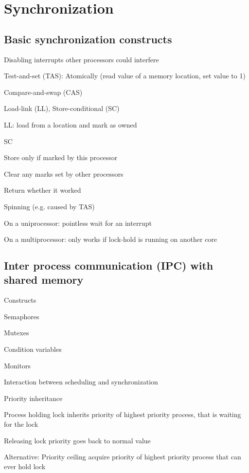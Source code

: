 \section{Synchronization}

\subsection{Basic synchronization constructs}
\enumstart
	\item Disabling interrupts \arrow other processors could interfere
	\item Test-and-set (TAS): Atomically (read value of a memory location, set value to 1)
	\item Compare-and-swap (CAS)
	\item Load-link (LL), Store-conditional (SC)
	\enumstart
		\item LL: load from a location and mark as owned
		\item SC
		\enumstart
			\item Store only if marked by this processor
			\item Clear any marks set by other processors
			\item Return whether it worked
		\enumend
	\enumend
	\item Spinning (e.g. caused by TAS)
	\enumstart
		\item On a uniprocessor: pointless \arrow wait for an interrupt\ddd
		\item On a multiprocessor: only works if lock-hold is running on another core
	\enumend
\enumend

\subsection{Inter process communication (IPC) with shared memory}
\enumstart
	\item Constructs
	\enumstart
		\item Semaphores
		\item Mutexes
		\item Condition variables
		\item Monitors
	\enumend
	\item Interaction between scheduling and synchronization
	\item Priority inheritance
	\enumstart
		\item Process holding lock inherits priority of highest priority process, that is waiting for the lock
		\item Releasing lock \arrow priority goes back to normal value
		\item Alternative: Priority ceiling \arrow acquire priority of highest priority process that can ever hold lock
	\enumend
\enumend

